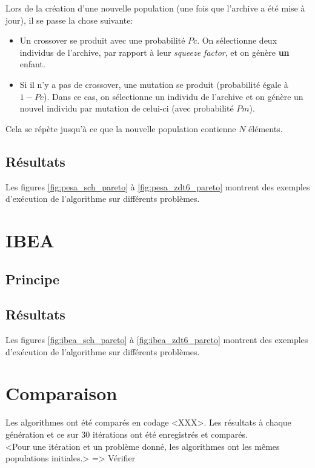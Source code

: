 \documentclass[12pt, letterpaper]{article}
\begin{document}
Lors de la création d'une nouvelle population (une fois que l'archive
a été mise à jour), il se passe la chose suivante:

\begin{itemize}
  
\item Un crossover se produit avec une probabilité $Pc$. On
  sélectionne deux individus de l'archive, par rapport à leur
  \textit{squeeze factor}, et on génère \textbf{un} enfant.\\
  
\item Si il n'y a pas de crossover, une mutation se produit
  (probabilité égale à $1 - Pc$). Dans ce cas, on sélectionne un
  individu de l'archive et on génère un nouvel individu par mutation
  de celui-ci (avec probabilité $Pm$).
  
\end{itemize}

Cela se répète jusqu'à ce que la nouvelle population contienne $N$
éléments.

\subsection{Résultats}
Les figures \ref{fig:pesa_sch_pareto} à \ref{fig:pesa_zdt6_pareto}
montrent des exemples d'exécution de l'algorithme sur différents
problèmes.

\section{IBEA}

\subsection{Principe}

\subsection{Résultats}
Les figures \ref{fig:ibea_sch_pareto} à \ref{fig:ibea_zdt6_pareto}
montrent des exemples d'exécution de l'algorithme sur différents
problèmes.


\section{Comparaison}

Les algorithmes ont été comparés en codage <XXX>. Les résultats à
chaque génération et ce sur 30 itérations ont été enregistrés et
comparés.\\
<Pour une itération et un problème donné, les algorithmes ont les mêmes
populations initiales.> => Vérifier
\end{document}
